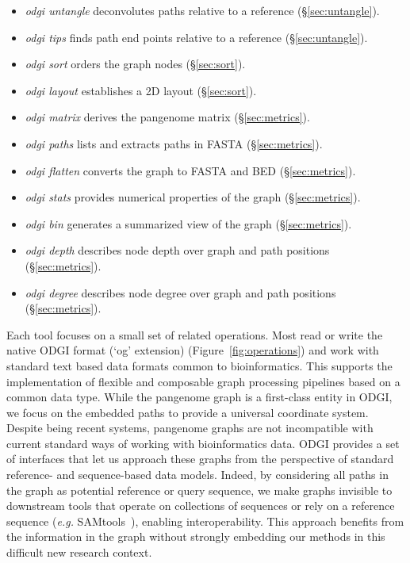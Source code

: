 \documentclass{bioinfo}
\begin{document}
\begin{itemize}
\item \textit{odgi untangle} deconvolutes paths relative to a reference (\S\ref{sec:untangle}).
\item \textit{odgi tips} finds path end points relative to a reference (\S\ref{sec:untangle}).
\item \textit{odgi sort} orders the graph nodes (\S\ref{sec:sort}).
\item \textit{odgi layout} establishes a 2D layout (\S\ref{sec:sort}).
\item \textit{odgi matrix} derives the pangenome matrix (\S\ref{sec:metrics}).
\item \textit{odgi paths} lists and extracts paths in FASTA (\S\ref{sec:metrics}).
\item \textit{odgi flatten} converts the graph to FASTA and BED (\S\ref{sec:metrics}).
\item \textit{odgi stats} provides numerical properties of the graph (\S\ref{sec:metrics}).
\item \textit{odgi bin} generates a summarized view of the graph (\S\ref{sec:metrics}).
\item \textit{odgi depth} describes node depth over graph and path positions (\S\ref{sec:metrics}).
\item \textit{odgi degree} describes node degree over graph and path positions (\S\ref{sec:metrics}).
\end{itemize}

Each tool focuses on a small set of related operations.
Most read or write the native ODGI format (`og' extension) (Figure~\ref{fig:operations}) and work with standard text based data formats common to bioinformatics.
This supports the implementation of flexible and composable graph processing pipelines based on a common data type.
While the pangenome graph is a first-class entity in ODGI, we focus on the embedded paths to provide a universal coordinate system.
Despite being recent systems, pangenome graphs are not incompatible with current standard ways of working with bioinformatics data.
ODGI provides a set of interfaces that let us approach these graphs from the perspective of standard reference- and sequence-based data models.
Indeed, by considering all paths in the graph as potential reference or query sequence, we make graphs invisible to downstream tools that operate on collections of sequences or rely on a reference sequence (\textit{e.g.} SAMtools~\citep{Li2009}), enabling interoperability.
This approach benefits from the information in the graph without strongly embedding our methods in this difficult new research context.
\end{document}
